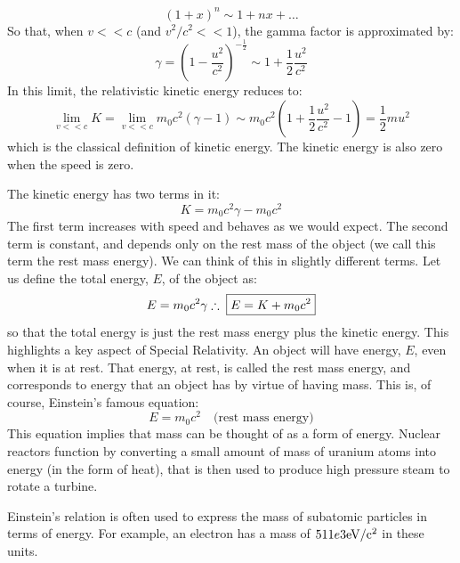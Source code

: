 \begin{equation}
(1+x)^n\sim 1 + nx +\dots
\end{equation}
So that, when $v<<c$ (and $v^2/c^2<<1$), the gamma factor is approximated by:
\begin{equation}
\gamma=\left(1-\frac{u^2}{c^2}\right)^{-\frac{1}{2}}\sim 1+\frac{1}{2}\frac{u^2}{c^2}
\end{equation}
In this limit, the relativistic kinetic energy reduces to:
\begin{equation}
\lim_{v<<c}K=\lim_{v<<c}m_0c^2(\gamma -1)\sim m_0c^2\left(1+\frac{1}{2}\frac{u^2}{c^2} - 1  \right)=\frac{1}{2}mu^2
\end{equation}
which is the classical definition of kinetic energy. The kinetic energy is also zero when the speed is zero.

The kinetic energy has two terms in it:
\begin{equation}
K=m_0c^2\gamma -m_0c^2
\end{equation}
The first term increases with speed and behaves as we would expect. The second term is constant, and depends only on the rest mass of the object (we call this term the rest mass energy). We can think of this in slightly different terms. Let us define the total energy, $E$, of the object as:
\begin{equation}
E=m_0c^2\gamma\\
\therefore \;\boxed{E = K+m_0c^2}
\end{equation}
so that the total energy is just the rest mass energy plus the kinetic energy. This highlights a key aspect of Special Relativity. An object will have energy, $E$, even when it is at rest. That energy, at rest, is called the rest mass energy, and corresponds to energy that an object has by virtue of having mass. This is, of course, Einstein's famous equation:
\begin{equation}
\boxed{E=m_0c^2}\quad \text{(rest mass energy)}
\end{equation}
This equation implies that mass can be thought of as a form of energy. Nuclear reactors function by converting a small amount of mass of uranium atoms into energy (in the form of heat), that is then used to produce high pressure steam to rotate a turbine.

Einstein's relation is often used to express the mass of subatomic particles in terms of energy. For example, an electron has a mass of $511e3 {\rm eV/c^2}$ in these units.

